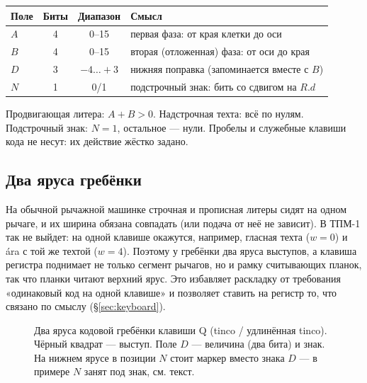 \documentclass[11pt,a4paper]{article}
\begin{document}
\begin{center}\small
\begin{tabular}{@{}lccl@{}}
\toprule
Поле & Биты & Диапазон & Смысл \\
\midrule
$A$ & 4 & 0--15 & первая фаза: от края клетки до оси \\
$B$ & 4 & 0--15 & вторая (отложенная) фаза: от оси до края \\
$D$ & 3 & $-4\ldots+3$ & нижняя поправка (запоминается вместе с $B$) \\
$N$ & 1 & 0/1 & подстрочный знак: бить со сдвигом на $R.d$ \\
\bottomrule
\end{tabular}
\end{center}

Продвигающая литера: $A + B > 0$. Надстрочная техта: всё по нулям. Подстрочный знак: $N = 1$, остальное — нули. Пробелы и служебные клавиши кода не несут: их действие жёстко задано.

\subsection{Два яруса гребёнки}

На обычной рычажной машинке строчная и прописная литеры сидят на одном рычаге, и их ширина обязана совпадать (или подача от неё не зависит). В ТПМ-1 так не выйдет: на одной клавише окажутся, например, гласная техта ($w=0$) и ára с той же техтой ($w=4$). Поэтому у гребёнки два яруса выступов, а клавиша регистра поднимает не только сегмент рычагов, но и рамку считывающих планок, так что планки читают верхний ярус. Это избавляет раскладку от требования «одинаковый код на одной клавише» и позволяет ставить на регистр то, что связано по смыслу (\S\ref{sec:keyboard}).

\begin{figure}[h]
\centering
{}
\caption{Два яруса кодовой гребёнки клавиши Q (tinco / удлинённая tinco). Чёрный квадрат — выступ. Поле $D$ — величина (два бита) и знак. На нижнем ярусе в позиции $N$ стоит маркер вместо знака $D$ — в примере $N$ занят под знак, см. текст.}
\label{fig:comb}
\end{figure}
\end{document}

